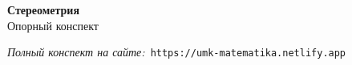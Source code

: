 \documentclass{umk-matematika}
\begin{document}
\begin{center}
{\Large\bfseries Стереометрия}
\\[0.3cm]{\large Опорный конспект}
\end{center}
\vspace{0.5cm}

\begin{center}
\textit{Полный конспект на сайте:}\
\texttt{https://umk-matematika.netlify.app}
\end{center}
\end{document}
